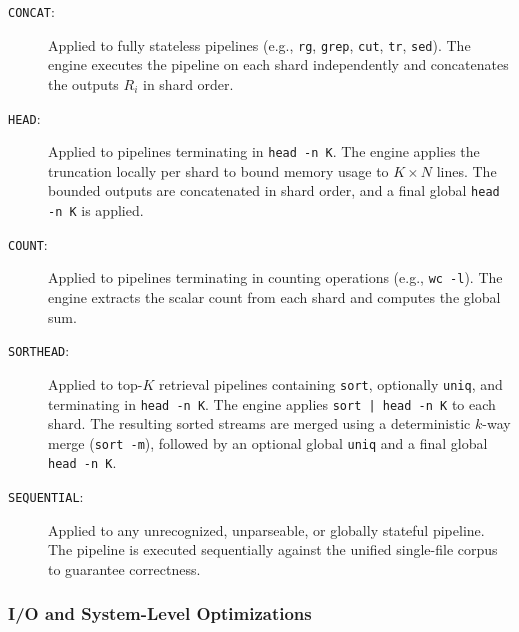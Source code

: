 \documentclass{llmxive}
\begin{document}
\begin{description}
    \item[\texttt{CONCAT}:] Applied to fully stateless pipelines (e.g., \texttt{rg}, \texttt{grep}, \texttt{cut}, \texttt{tr}, \texttt{sed}). The engine executes the pipeline on each shard independently and concatenates the outputs $R_i$ in shard order.
    
    \item[\texttt{HEAD}:] Applied to pipelines terminating in \texttt{head -n K}. The engine applies the truncation locally per shard to bound memory usage to $K \times N$ lines. The bounded outputs are concatenated in shard order, and a final global \texttt{head -n K} is applied.
    
    \item[\texttt{COUNT}:] Applied to pipelines terminating in counting operations (e.g., \texttt{wc -l}). The engine extracts the scalar count from each shard and computes the global sum.
    
    \item[\texttt{SORTHEAD}:] Applied to top-$K$ retrieval pipelines containing \texttt{sort}, optionally \texttt{uniq}, and terminating in \texttt{head -n K}. The engine applies \texttt{sort | head -n K} to each shard. The resulting sorted streams are merged using a deterministic $k$-way merge (\texttt{sort -m}), followed by an optional global \texttt{uniq} and a final global \texttt{head -n K}.
    
    \item[\texttt{SEQUENTIAL}:] Applied to any unrecognized, unparseable, or globally stateful pipeline. The pipeline is executed sequentially against the unified single-file corpus to guarantee correctness.
\end{description}

\subsubsection{I/O and System-Level Optimizations}
\end{document}
